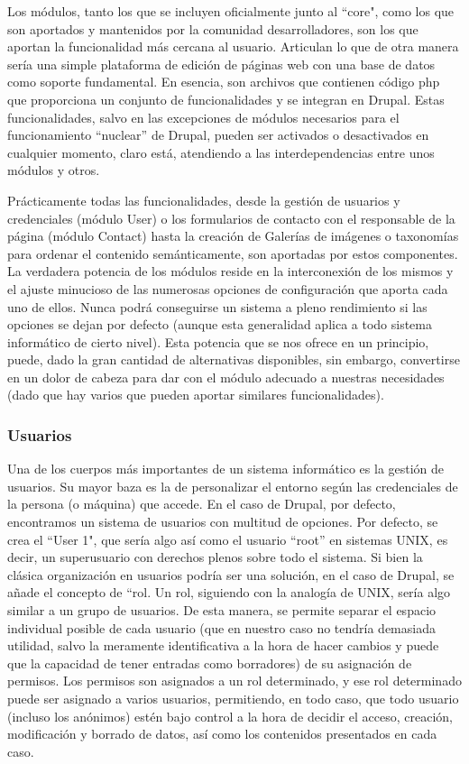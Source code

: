 \par Los módulos, tanto los que se incluyen oficialmente junto al ``core", como los que son aportados y mantenidos por la comunidad desarrolladores, son los que aportan la funcionalidad más cercana al usuario. Articulan lo que de otra manera sería una simple plataforma de edición de páginas web con una base de datos como soporte fundamental.
En esencia, son archivos que contienen código php que proporciona un conjunto de funcionalidades y se integran en Drupal. Estas funcionalidades, salvo en las excepciones de módulos necesarios para el funcionamiento ``nuclear'' de Drupal, pueden ser activados o desactivados en cualquier momento, claro está, atendiendo a las interdependencias entre unos módulos y otros.
\par Prácticamente todas las funcionalidades, desde la gestión de usuarios y credenciales (módulo User) o los formularios de contacto con el responsable de la página (módulo Contact) hasta la creación de Galerías de imágenes o taxonomías para ordenar el contenido semánticamente, son aportadas por estos componentes.
La verdadera potencia de los módulos reside en la interconexión de los mismos y el ajuste minucioso de las numerosas opciones de configuración que aporta cada uno de ellos. Nunca podrá conseguirse un sistema a pleno rendimiento si las opciones se dejan por defecto (aunque esta generalidad aplica a todo sistema informático de cierto nivel). Esta potencia que se nos ofrece en un principio, puede, dado la gran cantidad de alternativas disponibles, sin embargo, convertirse en un dolor de cabeza para dar con el módulo adecuado a nuestras necesidades (dado que hay varios que pueden aportar similares funcionalidades).

\subsubsection{Usuarios}
\label{cha:usuarios}
\par Una de los cuerpos más importantes de un sistema informático es la gestión de usuarios. Su mayor baza es la de personalizar el entorno según las credenciales de la persona (o máquina) que accede. En el caso de Drupal, por defecto, encontramos un sistema de usuarios con multitud de opciones. Por defecto, se crea el ``User 1", que sería algo así como el usuario ``root'' en sistemas UNIX, es decir, un superusuario con derechos plenos sobre todo el sistema.
Si bien la clásica organización en usuarios podría ser una solución, en el caso de Drupal, se añade el concepto de ``rol. Un rol, siguiendo con la analogía de UNIX, sería algo similar a un grupo de usuarios. De esta manera, se permite separar el espacio individual posible de cada usuario (que en nuestro caso no tendría demasiada utilidad, salvo la meramente identificativa a la hora de hacer cambios y puede que la capacidad de tener entradas como borradores) de su asignación de permisos.
Los permisos son asignados a un rol determinado, y ese rol determinado puede ser asignado a varios usuarios, permitiendo, en todo caso, que todo usuario (incluso los anónimos) estén bajo control a la hora de decidir el acceso, creación, modificación y borrado de datos, así como los contenidos presentados en cada caso.

